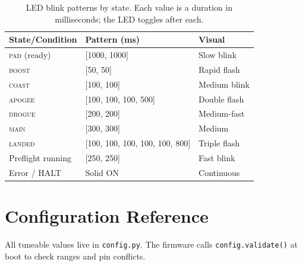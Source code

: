 \documentclass[11pt, a4paper, twoside]{article}
\newcommand{\state}[1]{\textsc{#1}}
\newcommand{\file}[1]{\texttt{#1}}
\begin{document}
\begin{table}[ht]
\centering
\caption{LED blink patterns by state. Each value is a duration in milliseconds; the LED toggles after each.}
\label{tab:led}
\begin{tabular}{l l l}
\toprule
\textbf{State/Condition} & \textbf{Pattern (ms)} & \textbf{Visual} \\
\midrule
\state{pad} (ready) & [1000, 1000] & Slow blink \\
\state{boost} & [50, 50] & Rapid flash \\
\state{coast} & [100, 100] & Medium blink \\
\state{apogee} & [100, 100, 100, 500] & Double flash \\
\state{drogue} & [200, 200] & Medium-fast \\
\state{main} & [300, 300] & Medium \\
\state{landed} & [100, 100, 100, 100, 100, 800] & Triple flash \\
Preflight running & [250, 250] & Fast blink \\
Error / HALT & Solid ON & Continuous \\
\bottomrule
\end{tabular}
\end{table}

\section{Configuration Reference}
\label{sec:config}

All tuneable values live in \file{config.py}. The firmware calls \texttt{config.validate()} at boot to check ranges and pin conflicts.
\end{document}
